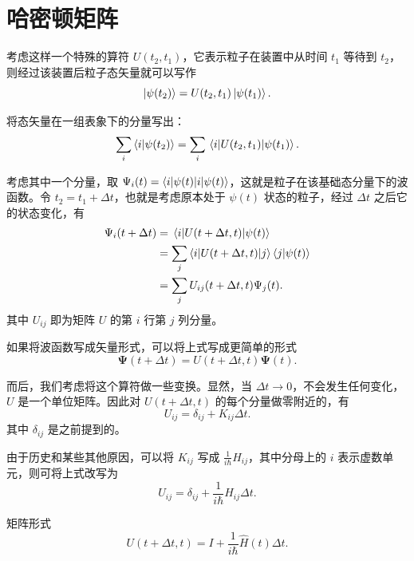 \documentclass[12pt,a4paper,oneside]{book}
\begin{document}
\section{哈密顿矩阵}
考虑这样一个特殊的算符 $U(t_2,t_1)$，它表示粒子在装置中从时间 $t_1$ 等待到 $t_2$，则经过该装置后粒子态矢量就可以写作
\begin{equation}
    \ket{\psi(t_2)}=U(t_2,t_1)\ket{\psi(t_1)}. 
\end{equation}

将态矢量在一组表象下的分量写出：
\begin{equation}
    \sum_i\braket{i}{\psi(t_2)}=\sum_i\mel{i}{U(t_2,t_1)}{\psi(t_1)}.
\end{equation}

考虑其中一个分量，取 $ \Psi_i(t)=\braket{i|\psi(t)} $，这就是粒子在该基础态分量下的波函数。令 $t_2 = t_1+\Delta t$，也就是考虑原本处于 $\psi(t)$ 状态的粒子，经过 $\Delta t$ 之后它的状态变化，有
\begin{equation}
    \begin{aligned}
        \Psi_i(t+\Delta t)&=\mel{i}{U(t+\Delta t, t)}{\psi(t)}\\
        &=\sum_j\braket{i}{U(t+\Delta t, t)|j}\braket{j}{\psi(t)}\\
        &=\sum_j U_{ij}(t+\Delta t, t)\Psi_j(t).
        \end{aligned}
\end{equation}
其中 $U_{ij}$ 即为矩阵 $U$ 的第 $i$ 行第 $j$ 列分量。

如果将波函数写成矢量形式，可以将上式写成更简单的形式
\begin{equation}
    \boldsymbol{\Psi}(t+\Delta t)=U(t+\Delta t, t)\boldsymbol{\Psi}(t).
\end{equation}

而后，我们考虑将这个算符做一些变换。显然，当 $\Delta t \to 0$，不会发生任何变化，$U$ 是一个单位矩阵。因此对 $U(t+\Delta t, t)$ 的每个分量做零附近的，有
\begin{equation}
    U_{ij}=\delta_{ij}+K_{ij}\Delta t. 
\end{equation}
其中 $\delta_{ij}$ 是之前提到的。

由于历史和某些其他原因，可以将 $K_{ij}$ 写成 $\frac{1}{i\hbar}H_{ij}$，其中分母上的 $i$ 表示虚数单元，则可将上式改写为
\begin{equation}
    U_{ij}=\delta_{ij}+\frac{1}{i\hbar}H_{ij}\Delta t.
\end{equation}

矩阵形式
\begin{equation}
    U(t+\Delta t, t)=I+\frac{1}{i\hbar}\hat{H}(t)\Delta t.
\end{equation}
\end{document}
